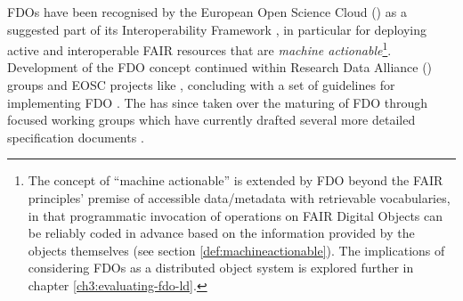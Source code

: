 FDOs have been recognised by the European Open Science Cloud () as a suggested part of its Interoperability Framework \cite{Kurowski 2021}, in particular for deploying active and interoperable FAIR resources that are \emph{machine actionable}\footnote{
  The concept of ``machine actionable'' is extended by FDO beyond the FAIR principles' premise of accessible data/metadata with retrievable vocabularies, in that programmatic invocation of operations on FAIR Digital Objects can be reliably coded in advance based on the information provided by the objects themselves (see section \vref{def:machineactionable}).
  The implications of considering FDOs as a distributed object system is explored further in chapter \vref{ch3:evaluating-fdo-ld}.
}. Development of the FDO concept continued within Research Data Alliance () groups and EOSC projects like , concluding with a set of guidelines for implementing FDO \cite{Bonino 2019}. The  has since taken over the maturing of FDO through focused working groups which have currently drafted several more detailed specification documents \cite{FDO Specs}.


